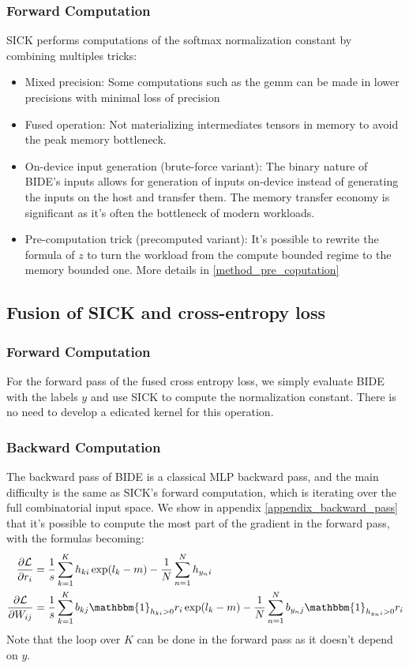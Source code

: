 \documentclass{article}
\begin{document}
\subsubsection{Forward Computation}
SICK performs computations of the softmax normalization constant by combining multiples tricks:
\begin{itemize}
\item Mixed precision: Some computations such as the gemm can be made in lower precisions with minimal loss of precision
\item Fused operation: Not materializing intermediates tensors in memory to avoid the peak memory bottleneck.
\item On-device input generation (brute-force variant): The binary nature of BIDE's inputs allows for generation of inputs on-device instead of generating the inputs on the host and transfer them. The memory transfer economy is significant as it's often the bottleneck of modern workloads.
\item Pre-computation trick (precomputed variant): It's possible to rewrite the formula of $z$ to turn the workload from the compute bounded regime to the memory bounded one. More details in \ref{method_pre_coputation}
\end{itemize}

\subsection{Fusion of SICK and cross-entropy loss}
\subsubsection{Forward Computation}
For the forward pass of the fused cross entropy loss, we simply evaluate BIDE with the labels $y$ and use SICK to compute the normalization constant. There is no need to develop a edicated kernel for this operation.

\subsubsection{Backward Computation}
The backward pass of BIDE is a classical MLP backward pass, and the main difficulty is the same as SICK's forward computation, which is iterating over the full combinatorial input space.
We show in appendix \ref{appendix_backward_pass} that it's possible to compute the most part of the gradient in the forward pass, with the formulas becoming:
\begin{align}
    \frac{\partial \mathcal{L}}{\partial r_i} &= \frac{1}{s} \sum_{k=1}^{K} h_{ki} \exp(l_k - m) - \frac{1}{N} \sum_{n=1}^{N} h_{y_ni} \\
    \frac{\partial \mathcal{L}}{\partial W_{ij}} &= \frac{1}{s} \sum_{k=1}^{K} b_{kj} \mathbbm{1}_{h_{ki} > 0} r_i \exp(l_k - m) - \frac{1}{N} \sum_{n=1}^{N} b_{y_nj} \mathbbm{1}_{h_{y_ni} > 0} r_i
\end{align}
Note that the loop over $K$ can be done in the forward pass as it doesn't depend on $y$.
\end{document}
